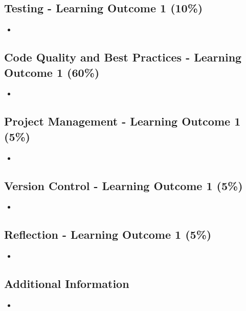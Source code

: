 \documentclass{article}
\begin{document}
	\subsection*{Testing - Learning Outcome 1 (10\%)}
	\begin{itemize}
		\item
	\end{itemize}

	\subsection*{Code Quality and Best Practices - Learning Outcome 1 (60\%)}
	\begin{itemize}
		\item  
	\end{itemize}

	\subsection*{Project Management - Learning Outcome 1 (5\%)}
	\begin{itemize}
		\item 	
	\end{itemize} 

	\subsection*{Version Control - Learning Outcome 1 (5\%)}
	\begin{itemize}
		\item 	
	\end{itemize} 

	\subsection*{Reflection - Learning Outcome 1 (5\%)}
	\begin{itemize}
		\item 	
	\end{itemize} 

	\subsection*{Additional Information}
	\begin{itemize}
		\item 
	\end{itemize} 
\end{document}
